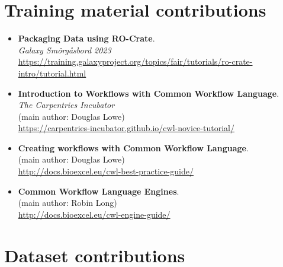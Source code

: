 \section{Training material contributions}

\begin{itemize}
  \item
    \textbf{Packaging Data using RO-Crate}.\\
    \emph{Galaxy Smörgåsbord 2023}\\
    \url{https://training.galaxyproject.org/topics/fair/tutorials/ro-crate-intro/tutorial.html}
  \item
    \textbf{Introduction to Workflows with Common Workflow Language}.\\
    \emph{The Carpentries Incubator}\\
    (main author: Douglas Lowe)\\
    \url{https://carpentries-incubator.github.io/cwl-novice-tutorial/}
  \item
    \textbf{Creating workflows with Common Workflow Language}.\\
    (main author: Douglas Lowe)\\
    \url{http://docs.bioexcel.eu/cwl-best-practice-guide/}
  \item
    \textbf{Common Workflow Language Engines}.\\
    (main author: Robin Long)\\
    \url{http://docs.bioexcel.eu/cwl-engine-guide/}
  \end{itemize}


\section{Dataset contributions}


